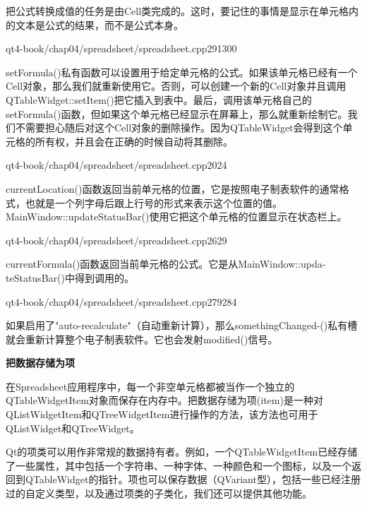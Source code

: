 \documentclass[11pt,oneside]{book}
\begin{document}
\begin{common-format}
把公式转换成值的任务是由Cell类完成的。这时，要记住的事情是显示在单元格内的文本是公式的结果，而不是公式本身。

\begin{cppline}{qt4-book/chap04/spreadsheet/spreadsheet.cpp}{291}{300}
\end{cppline}

setFormula()私有函数可以设置用于给定单元格的公式。如果该单元格已经有一个Cell对象，那么我们就重新使用它。否则，可以创建一个新的Cell对象并且调用QTableWidget::setItem()把它插入到表中。最后，调用该单元格自己的setFormula()函数，但如果这个单元格已经显示在屏幕上，那么就重新绘制它。我们不需要担心随后对这个Cell对象的删除操作。因为QTableWidget会得到这个单元格的所有权，并且会在正确的时候自动将其删除。

\begin{cppline}{qt4-book/chap04/spreadsheet/spreadsheet.cpp}{20}{24}
\end{cppline}

currentLocation()函数返回当前单元格的位置，它是按照电子制表软件的通常格式，也就是一个列字母后跟上行号的形式来表示这个位置的值。MainWindow::updateStatusBar()使用它把这个单元格的位置显示在状态栏上。

\begin{cppline}{qt4-book/chap04/spreadsheet/spreadsheet.cpp}{26}{29}
\end{cppline}

currentFormula()函数返回当前单元格的公式。它是从MainWindow::upda-teStatusBar()中得到调用的。

\begin{cppline}{qt4-book/chap04/spreadsheet/spreadsheet.cpp}{279}{284}
\end{cppline}

如果启用了"auto-recalculate"（自动重新计算），那么somethingChanged-()私有槽就会重新计算整个电子制表软件。它也会发射modified()信号。

\begin{framed}
\vspace{-\parskip}
\begin{center}
\textbf{把数据存储为项}
\end{center}

在Spreadsheet应用程序中，每一个非空单元格都被当作一个独立的QTableWidgetItem对象而保存在内存中。把数据存储为项(item)是一种对QListWidgetItem和QTreeWidgetItem进行操作的方法，该方法也可用于QListWidget和QTreeWidget。

Qt的项类可以用作非常规的数据持有者。例如，一个QTableWidgetItem已经存储了一些属性，其中包括一个字符串、一种字体、一种颜色和一个图标，以及一个返回到QTableWidget的指针。项也可以保存数据（QVariant型），包括一些已经注册过的自定义类型，以及通过项类的子类化，我们还可以提供其他功能。


\end{framed}
\end{common-format}
\end{document}
